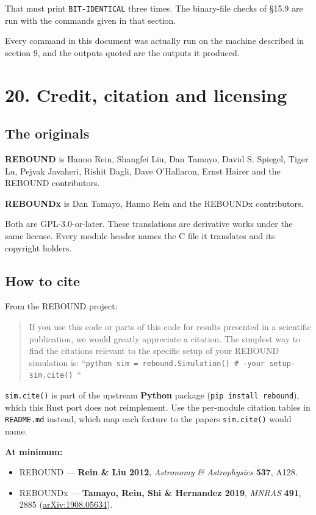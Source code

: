\documentclass[11pt]{article}
\begin{document}
That must print \texttt{BIT-IDENTICAL} three times. The binary-file checks of \S{}15.9 are run with the commands given in that section.

Every command in this document was actually run on the machine described in section 9, and the outputs quoted are the outputs it produced.

\section{20. Credit, citation and licensing}

\subsection{The originals}

\textbf{REBOUND} is \textcopyright{} Hanno Rein, Shangfei Liu, Dan Tamayo, David S. Spiegel, Tiger Lu, Pejvak Javaheri, Rishit Dagli, Dave O'Hallaron, Ernst Hairer and the REBOUND contributors.

\textbf{REBOUNDx} is \textcopyright{} Dan Tamayo, Hanno Rein and the REBOUNDx contributors.

Both are GPL-3.0-or-later. These translations are derivative works under the same license. Every module header names the C file it translates and its copyright holders.

\subsection{How to cite}

From the REBOUND project:

\begin{quote}
If you use this code or parts of this code for results presented in a scientific publication, we would greatly appreciate a citation. The simplest way to find the citations relevant to the specific setup of your REBOUND simulation is:  ``\texttt{python sim = rebound.Simulation() \# -your setup- sim.cite() }``
\end{quote}

\texttt{sim.cite()} is part of the upstream \textbf{Python} package (\texttt{pip install rebound}), which this Rust port does not reimplement. Use the per-module citation tables in \texttt{README.md} instead, which map each feature to the papers \texttt{sim.cite()} would name.

\textbf{At minimum:}

\begin{itemize}
\item REBOUND --- \textbf{Rein \& Liu 2012}, \emph{Astronomy \& Astrophysics} \textbf{537}, A128.
\item REBOUNDx --- \textbf{Tamayo, Rein, Shi \& Hernandez 2019}, \emph{MNRAS} \textbf{491}, 2885 (\href{https://arxiv.org/abs/1908.05634}{arXiv:1908.05634}).
\end{itemize}
\end{document}
